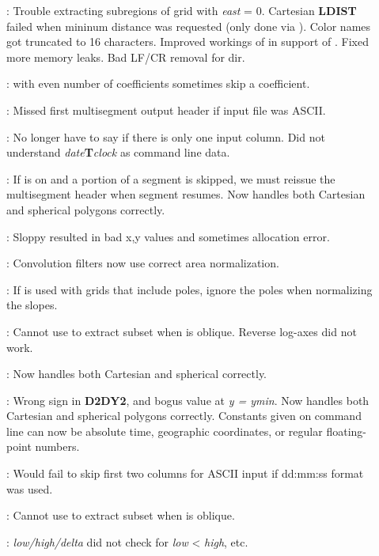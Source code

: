 \begin{description}
\item []: Trouble extracting subregions of grid with \emph{east} = 0.  Cartesian \textbf{LDIST} failed
when mininum distance was requested (only done via ).  Color names got truncated to 16 characters.
Improved workings of  in support of .  Fixed more memory leaks.
Bad LF/CR removal for  dir.
\item []:  with even number of coefficients sometimes skip a coefficient.
\item []: Missed first multisegment output header if input file was ASCII.
\item []: No longer have to say  if there is only one input column.  Did not understand
\emph{date}\textbf{T}\emph{clock} as command line data.
\item []: If  is on and a portion of a segment is skipped, we must
reissue the multisegment header when segment resumes.  Now handles both Cartesian
and spherical polygons correctly.
\item []: Sloppy  resulted in bad x,y values and sometimes allocation error.
\item []: Convolution filters now use correct area normalization.
\item []: If  is used with grids that include poles, ignore the poles
when normalizing the slopes.
\item []: Cannot use  to extract subset when  is oblique.  Reverse log-axes did not work.
\item []: Now handles both Cartesian and spherical correctly.
\item []: Wrong sign in \textbf{D2DY2}, and bogus value at \emph{y = ymin}.  Now handles both Cartesian
and spherical polygons correctly.  Constants given on command line can now be absolute time, geographic coordinates, or
regular floating-point numbers.
\item []: Would fail to skip first two columns for ASCII input if dd:mm:ss format was used.
\item []: Cannot use  to extract subset when  is oblique.
\item []: \emph{low/high/delta} did not check for \emph{low} < \emph{high}, etc.

\end{description}
